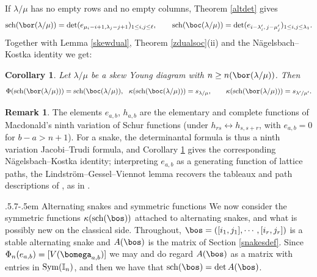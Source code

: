 \documentclass[11pt,reqno]{amsart}
\makeatletter
\newtheorem*{cor}{Corollary}%
\theoremstyle{definition} \newtheorem*{defn}{Definition}
\theoremstyle{definition}
\newtheorem*{rem}{Remark}
\numberwithin{equation}{section}
\def\subsection{\def\@secnumfont{\bfseries}\@startsection{subsection}{2}%
  {\parindent}{.5\linespacing\@plus.7\linespacing}{-.5em}%
  {\normalfont\bfseries}}
\makeatother
\begin{document}
\vskip12pt
\noindent If $\lambda/\mu$ has no empty rows and no empty columns, Theorem \ref{altdet} gives
$${\rm sch}(\bor(\lambda/\mu))=\det(e_{\mu_i-i+1,\lambda_j-j+1})_{1\le i,j\le\ell},\qquad {\rm sch}(\boc(\lambda/\mu))=\det(e_{i-\lambda'_i,\,j-\mu'_j})_{1\le i,j\le\lambda_1}.$$
Together with Lemma \ref{skewdual}, Theorem \ref{zdualsoc}(ii) and the N\"agelsbach--Kostka identity \cite[(I.5.5)]{Mac95} we get:
\begin{cor}\label{skewphi} Let $\lambda/\mu$ be a skew Young diagram with $n\ge n(\bor(\lambda/\mu))$. Then
\begin{gather*}\Phi({\rm sch}(\bor(\lambda/\mu)))={\rm sch}(\boc(\lambda/\mu)),\ \ \kappa({\rm sch}(\boc(\lambda/\mu)))=s_{\lambda/\mu},\qquad \kappa({\rm sch}(\bor(\lambda/\mu)))=s_{\lambda'/\mu'}.\end{gather*}\hfill\qedsymbol
\end{cor}
\begin{rem}\label{latticerem} The elements $e_{a,b}$, $h_{a,b}$ are the elementary and complete functions of Macdonald's ninth
variation of Schur functions \cite{Mac92} (under $h_{rs}\leftrightarrow h_{s,s+r}$, with $e_{a,b}=0$ for $b-a>n+1$). For a snake, the
determinantal formula is thus a ninth variation Jacobi--Trudi formula, and Corollary \ref{skewphi} gives the corresponding
N\"agelsbach--Kostka identity; interpreting $e_{a,b}$ as a generating function of lattice paths, the Lindstr\"om--Gessel--Viennot
lemma \cite{Lin73,GV85} recovers the tableaux and path descriptions of \cite{BR90,MY12}, as in \cite{NN06}.
\end{rem}





\subsection{Alternating snakes and symmetric functions}\label{altclassical}
We now consider the symmetric functions $\kappa({\rm sch}(\bos))$ attached to alternating snakes, and what is possibly new on the
classical side. Throughout, $\bos=([i_1,j_1],\cdots,[i_r,j_r])$ is a stable alternating snake and $A(\bos)$ is the matrix of Section
\ref{snakesdef}. 
Since $\Phi_n(e_{a,b})=[V(\bomega_{a,b})]$ we may and do regard $A(\bos)$ as a matrix with entries in
${\rm Sym}(\mathbb I_n)$, and then we have that ${\rm sch}(\bos)=\det A(\bos)$.
\end{document}
